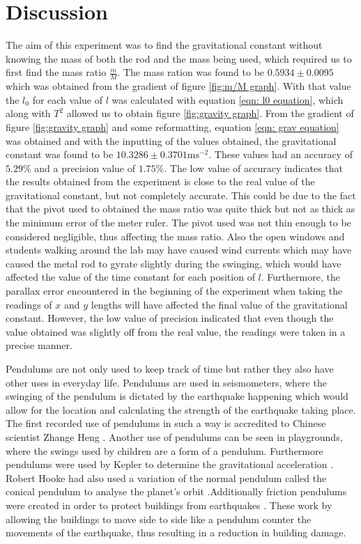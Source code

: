 \documentclass[12pt, a4paper]{article}
\begin{document}
\section*{Discussion}
The aim of this experiment was to find the gravitational constant without knowing the mass of both the rod and the mass being used, which required us to  first find the mass ratio $\frac{m}{M}$. The mass ration was found to be $0.5934\pm0.0095$ which was obtained from the gradient of figure \ref{fig:m/M graph}. With that value the $l_0$ for each value of $l$ was calculated with equation \ref{eqn: l0 equation}, which along with $T^2$ allowed us to obtain figure \ref{fig:gravity graph}. From the gradient of figure \ref{fig:gravity graph} and some reformatting, equation \ref{eqn: grav equation} was obtained and with the inputting of the values obtained, the gravitational constant was found to be $10.3286\pm0.3701 \text{ms}^{-2}$. These values had an accuracy of $5.29\%$ and a precision value of $1.75\%$. The low value of accuracy indicates that the results obtained from the experiment is close to the real value of the gravitational constant, but not completely accurate. This could be due to the fact that the pivot used to obtained the mass ratio was quite thick but not as thick as the minimum error of the meter ruler. The pivot used was not thin enough to be considered negligible, thus affecting the mass ratio. Also the open windows and students walking around the lab may have caused wind currents which may have caused the metal rod to gyrate slightly during the swinging, which would have affected the value of the time constant for each position of $l$. Furthermore, the parallax error encountered in the beginning of the experiment when taking the readings of $x$ and $y$ lengths will have affected the final value of the gravitational constant. However, the low value of precision indicated that even though the value obtained was slightly off from the real value, the readings were taken in a precise manner.

\smallskip
\noindent
Pendulums are not only used to keep track of time but rather they also have other uses in everyday life. Pendulums are used in seismometers, where the swinging of the pendulum is dictated by the earthquake happening which would allow for the location and calculating the strength of the earthquake taking place. The first recorded use of pendulums in such a way is accredited to Chinese scientist Zhange Heng \parencite{abel2019}. Another use of pendulums can be seen in playgrounds, where the swings used by children are a form of a pendulum. Furthermore pendulums were used by Kepler to determine the gravitational acceleration \parencite{taylor2019}. Robert Hooke had also used a variation of the normal pendulum called the conical pendulum to analyse the planet's orbit \parencite{taylor2019}.Additionally friction pendulums were created in order to protect buildings from earthquakes \parencite{abel2019}. These work by allowing the buildings to move side to side like a pendulum counter the movements of the earthquake, thus resulting in a reduction in building damage.
\end{document}
